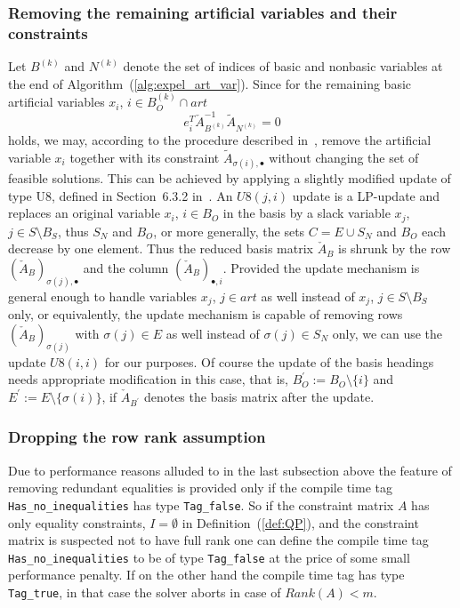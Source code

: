 \documentclass[a4paper]{article}
\begin{document}
\subsubsection{Removing the remaining artificial variables and their
constraints}
Let $B^{(k)}$ and $N^{(k)}$ denote the set of indices of basic and nonbasic
variables at the end of Algorithm~(\ref{alg:expel_art_var}).
Since for the remaining basic artificial variables $x_{i}$,
$i \in B_{O}^{(k)} \cap art$
\begin{equation}
e_{i}^{T}\check{A}_{B^{(k)}}^{-1}\tilde{A}_{N^{(k)}} = 0 
\end{equation}
holds,
we may, according to the procedure described in~\cite{Chvatal}, remove
the artificial variable $x_{i}$ together with its constraint
$\tilde{A}_{\sigma(i), \bullet}$ without changing the set of feasible
solutions.
This can be achieved by applying a slightly modified update
of type U8, defined in Section~6.3.2 in~\cite{Sven}. An $U8(j,i)$ update is a
LP-update and replaces an original variable $x_{i}$, $i \in B_{O}$ in the basis
by a slack variable $x_{j}$, $j \in S \setminus B_{S}$,
thus $S_{N}$ and $B_{O}$, or more generally, the sets
$C=E \cup S_{N}$ and $B_{O}$ each decrease by one element. Thus the reduced
basis matrix $\check{A}_{B}$ is shrunk by the
row $\left(\check{A}_{B}\right)_{\sigma(j), \bullet}$ and
the column $\left(\check{A}_{B}\right)_{\bullet, i}$. Provided the
update mechanism is general enough to handle variables $x_{j}$, $j \in art$ as
well instead of $x_{j}$, $j \in S \setminus B_{S}$ only, or equivalently,
the update mechanism is capable of
removing rows $\left(\check{A}_{B}\right)_{\sigma(j)}$ with $\sigma(j) \in E$
as well instead of $\sigma(j) \in S_{N}$ only, we can use the update $U8(i,i)$
for our purposes.
Of course the update of the basis headings needs appropriate modification
in this case, that is, $B_{O}^{\prime}:=B_{O} \setminus \{i\}$ and
$E^{\prime}:=E \setminus \{ \sigma(i)\}$, if $\check{A}_{B^{\prime}}$ denotes
the basis matrix after the update. 

\subsubsection{Dropping the row rank assumption}
Due to performance reasons alluded to in the last subsection above the feature
of removing redundant equalities is provided only if the compile time tag
\texttt{Has\_no\_inequalities} has type \texttt{Tag\_false}.
So if the constraint matrix $A$ has
only equality constraints, $I=\emptyset$ in Definition~(\ref{def:QP}), and the
constraint matrix is suspected not to have full rank one can define the
compile time tag \texttt{Has\_no\_inequalities} to be of type
\texttt{Tag\_false} at the price of
some small performance penalty. If on the other hand the compile time tag has
type \texttt{Tag\_true}, in that case the solver aborts in case of $Rank(A)<m$.  
\end{document}
